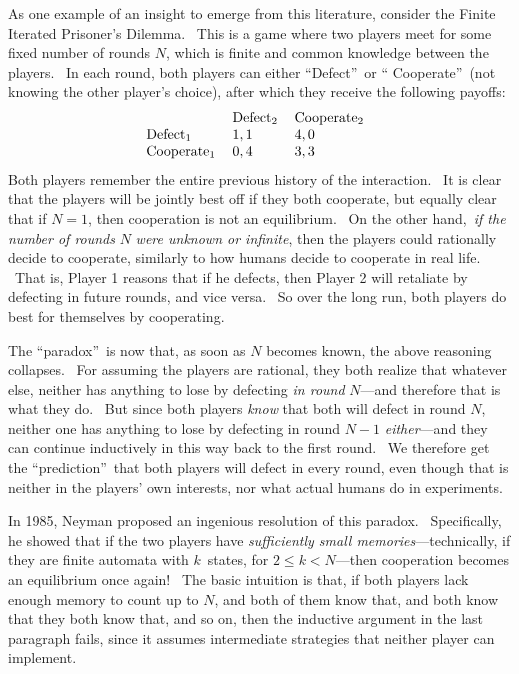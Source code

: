 \documentclass[12pt,onecolumn]{article}%
\begin{document}
As one example of an insight to emerge from this literature, consider the
Finite Iterated Prisoner's Dilemma. \ This is a game where two players meet
for some fixed number of rounds $N$, which is finite and common knowledge
between the players. \ In each round, both players can either
\textquotedblleft Defect\textquotedblright\ or \textquotedblleft
Cooperate\textquotedblright\ (not knowing the other player's choice), after
which they receive the following payoffs:%
\[%
\begin{tabular}
[c]{lll}
& Defect$_{2}$ & Cooperate$_{2}$\\
Defect$_{1}$ & $1,1$ & $4,0$\\
Cooperate$_{1}$ & $0,4$ & $3,3$%
\end{tabular}
\ \
\]
Both players remember the entire previous history of the interaction. \ It is
clear that the players will be jointly best off if they both cooperate, but
equally clear that if $N=1$, then cooperation is not an equilibrium. \ On the
other hand,\ \textit{if the number of rounds }$N$\textit{ were unknown or
infinite}, then the players could rationally decide to cooperate, similarly to
how humans decide to cooperate in real life. \ That is, Player 1 reasons that
if he defects, then Player 2 will retaliate by defecting in future rounds, and
vice versa. \ So over the long run, both players do best for themselves by cooperating.

The \textquotedblleft paradox\textquotedblright\ is now that, as soon as $N$
becomes known, the above reasoning collapses. \ For assuming the players are
rational, they both realize that whatever else, neither has anything to lose
by defecting \textit{in round} $N$---and therefore that is what they do. \ But
since both players \textit{know} that both will defect in round $N$, neither
one has anything to lose by defecting in round $N-1$ \textit{either}---and
they can continue inductively in this way back to the first round. \ We
therefore get the \textquotedblleft prediction\textquotedblright\ that both
players will defect in every round, even though that is neither in the
players' own interests, nor what actual humans do in experiments.

In 1985, Neyman \cite{neyman} proposed an ingenious resolution of this
paradox. \ Specifically, he showed that if the two players have
\textit{sufficiently small memories}---technically, if they are finite
automata with $k$\ states, for $2\leq k<N$---then cooperation becomes an
equilibrium once again! \ The basic intuition is that, if both players lack
enough memory to count up to $N$, and both of them know that, and both know
that they both know that, and so on, then the inductive argument in the last
paragraph fails, since it assumes intermediate strategies that neither player
can implement.
\end{document}
